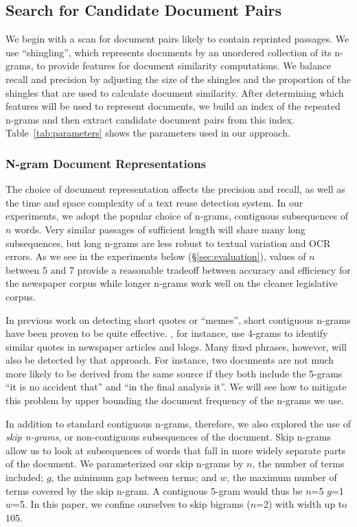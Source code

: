 \documentclass[pdftex,11pt]{article}
\begin{document}
\subsection{Search for Candidate Document Pairs}
\label{sec:all-pairs}

We begin with a scan for document pairs likely to contain reprinted
passages.  We use ``shingling'', which represents documents by an
unordered collection of its n-grams, to provide features for document
similarity computations.  We balance recall and precision by adjusting
the size of the shingles and the proportion of the shingles that are
used to calculate document similarity.  After determining which
features will be used to represent documents, we build an index of the
repeated n-grams and then extract candidate document pairs from this
index.  Table~\ref{tab:parameters} shows the parameters used in our
approach.

\subsubsection{N-gram Document Representations}
\label{sec:ngrams}

The choice of document representation affects the precision and
recall, as well as the time and space complexity of a text reuse
detection system.  In our experiments, we adopt the popular choice of
n-grams, contiguous subsequences of $n$ words.  Very similar passages
of sufficient length will share many long subsequences, but long
n-grams are less robust to textual variation and OCR errors.  As we
see in the experiments below (\S\ref{sec:evaluation}), values of $n$
between 5 and 7 provide a reasonable tradeoff between accuracy and
efficiency for the newspaper corpus while longer n-grams work well on
the cleaner legislative corpus.

In previous work on detecting short quotes or ``memes'', short
contiguous n-grams have been proven to be quite effective.
\citet{suen13:nifty}, for instance, use 4-grams to identify similar
quotes in newspaper articles and blogs.  Many fixed phrases, however,
will also be detected by that approach.  For instance, two documents
are not much more likely to be derived from the same source if they
both include the 5-grams ``it is no accident that'' and ``in the final
analysis it''.  We will see how to mitigate this problem by upper
bounding the document frequency of the n-grams we use.

In addition to standard contiguous n-grams, therefore, we also
explored the use of \emph{skip n-grams}, or non-contiguous
subsequences of the document.  Skip n-grams allow us to look at
subsequences of words that fall in more widely separate parts of the
document.  We parameterized our skip n-grams by $n$, the number of
terms included; $g$, the minimum gap between terms; and $w$, the
maximum number of terms covered by the skip n-gram.  A contiguous
5-gram would thus be $n$=5 $g$=1 $w$=5.  In this paper, we confine
ourselves to skip bigrams ($n$=2) with width up to 105.
\end{document}
